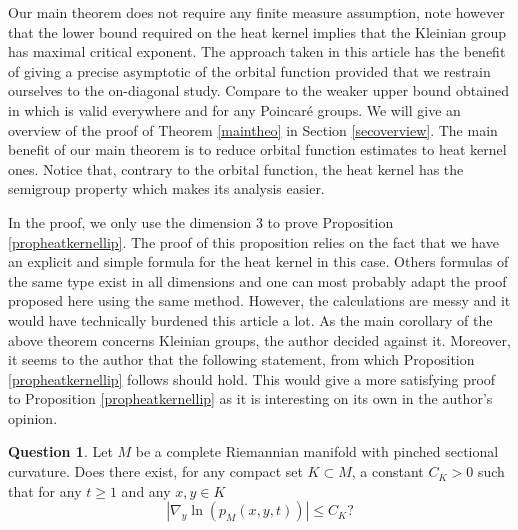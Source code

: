 \documentclass[10pt]{amsart}
\theoremstyle{plain}
\theoremstyle{definition}
\newtheorem*{question}{Question}
\begin{document}
Our main theorem does not require any finite measure assumption, note however that the lower bound required on the heat kernel implies that the Kleinian group has maximal critical exponent. The approach taken in this article has the benefit of giving a precise asymptotic of the orbital function provided that we restrain ourselves to the on-diagonal study. Compare to the weaker upper bound obtained in \cite[Th.\,1.2]{artmoiheatcounting1} which is valid everywhere and for any Poincaré groups. We will give an overview of the proof of Theorem \ref{maintheo} in Section \ref{secoverview}. The main benefit of our main theorem is to reduce orbital function estimates to heat kernel ones. Notice that, contrary to the orbital function, the heat kernel has the semigroup property which makes its analysis easier.

In the proof, we only use the dimension 3 to prove Proposition \ref{propheatkernellip}. The proof of this proposition relies on the fact that we have an explicit and simple formula for the heat kernel in this case. Others formulas of the same type exist in all dimensions and one can most probably adapt the proof proposed here using the same method. However, the calculations are messy and it would have technically burdened this article a lot. As the main corollary of the above theorem concerns Kleinian groups, the author decided against it. Moreover, it seems to the author that the following statement, from which Proposition \ref{propheatkernellip} follows should hold. This would give a more satisfying proof to Proposition \ref{propheatkernellip} as it is interesting on its own in the author's opinion.

\begin{question}
Let $M$ be a complete Riemannian manifold with pinched sectional curvature. Does there exist, for any compact set $K \subset M$, a constant $C_K > 0$ such that for any $t \ge 1$ and any $x, y \in K$
\[
| \nabla_y \ln (p_M(x,y,t)) | \le C_K ?
\]
\end{question}
\end{document}
